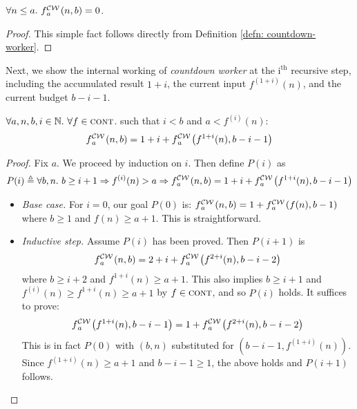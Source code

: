 \begin{lem} \label{lem: cdt-init}
	$\forall n\le a.~\cdw{f}{a} (n, b) = 0$.
\end{lem}
\begin{proof}
This simple fact follows directly from Definition \ref{defn: countdown-worker}.
\end{proof}
Next, we show the internal working of \emph{countdown worker} at the $\text{i}^\text{th}$ recursive step, including the accumulated result $1+i$, the current input $f^{(1+i)}(n)$, and the current budget $b-i-1$.
\begin{lem} \label{lem: cdt-intermediate}
	$\forall a, n, b, i \in \mathbb{N}.~\forall f \in \text{\scshape{cont}}$. such that $i < b$ and $a < f^{(i)}(n)$:~
	\begin{equation}  \label{eq: cdt-intermediate}
	\cdw{f}{a}(n, b) = 1 + i + \cdw{f}{a}\left(f^{1+i}(n), b - i - 1\right)
	\end{equation}
\end{lem}
\begin{proof}
	Fix $a$. We proceed by induction on $i$. Then define $P(i)$ as
	\begin{equation*}
	P(i) \triangleq \forall b, n.~ b\ge i+1 \Rightarrow f^{(i)}(n) > a \Rightarrow \cdw{f}{a}(n, b) = 1 + i + \cdw{f}{a}\left(f^{1+i}(n), b - i - 1\right)
	\end{equation*}
	\begin{itemize}[leftmargin=*]
		\item \textit{Base case.} For $i = 0$, our goal $P(0)$ is:
		$\cdw{f}{a}(n, b) = 1 + \cdw{f}{a}\left(f(n), b - 1\right)$
		where $b \ge 1$ and $f(n)\ge a+1$. This is straightforward.
		\item \textit{Inductive step.} Assume $P(i)$ has been proved. Then $P(i+1)$ is
		\begin{equation*}
		\cdw{f}{a}(n, b) = 2 + i + \cdw{f}{a}\left( f^{2+i}(n), b - i - 2 \right)
		\end{equation*}
		where $b \ge i+2$ and $f^{1+i}(n) \ge a+1$. This also implies $b\ge i+1$ and $\displaystyle f^{(i)}(n) \ge f^{1+i}(n)\ge a+1$ by $f\in \text{\scshape{cont}}$, and so $P(i)$ holds. It suffices to prove:
		\begin{equation*}
		\cdw{f}{a}\left(f^{1+i}(n), b-i-1\right) = 1 + \cdw{f}{a}\left( f^{2+i}(n), b-i-2 \right)
		\end{equation*}
		This is in fact $P(0)$ with $(b, n)$ substituted for $\left(b-i-1, f^{(1+i)}(n)\right)$. Since $f^{(1+i)}(n) \ge a+1$ and $b-i-1\ge 1$, the above holds and $P(i+1)$ follows.
	\end{itemize}
\end{proof}
